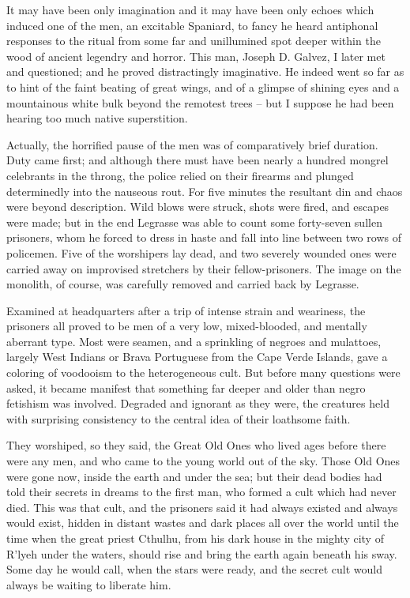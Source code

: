 It may have been only imagination and it may have been only echoes which induced one of the men, an excitable Spaniard, to fancy he heard antiphonal responses to the ritual from some far and unillumined spot deeper within the wood of ancient legendry and horror. This man, Joseph D. Galvez, I later met and questioned; and he proved distractingly imaginative. He indeed went so far as to hint of the faint beating of great wings, and of a glimpse of shining eyes and a mountainous white bulk beyond the remotest trees⁠ – but I suppose he had been hearing too much native superstition.

Actually, the horrified pause of the men was of comparatively brief duration. Duty came first; and although there must have been nearly a hundred mongrel celebrants in the throng, the police relied on their firearms and plunged determinedly into the nauseous rout. For five minutes the resultant din and chaos were beyond description. Wild blows were struck, shots were fired, and escapes were made; but in the end Legrasse was able to count some forty-seven sullen prisoners, whom he forced to dress in haste and fall into line between two rows of policemen. Five of the worshipers lay dead, and two severely wounded ones were carried away on improvised stretchers by their fellow-prisoners. The image on the monolith, of course, was carefully removed and carried back by Legrasse.

Examined at headquarters after a trip of intense strain and weariness, the prisoners all proved to be men of a very low, mixed-blooded, and mentally aberrant type. Most were seamen, and a sprinkling of negroes and mulattoes, largely West Indians or Brava Portuguese from the Cape Verde Islands, gave a coloring of voodooism to the heterogeneous cult. But before many questions were asked, it became manifest that something far deeper and older than negro fetishism was involved. Degraded and ignorant as they were, the creatures held with surprising consistency to the central idea of their loathsome faith.

They worshiped, so they said, the Great Old Ones who lived ages before there were any men, and who came to the young world out of the sky. Those Old Ones were gone now, inside the earth and under the sea; but their dead bodies had told their secrets in dreams to the first man, who formed a cult which had never died. This was that cult, and the prisoners said it had always existed and always would exist, hidden in distant wastes and dark places all over the world until the time when the great priest Cthulhu, from his dark house in the mighty city of R’lyeh under the waters, should rise and bring the earth again beneath his sway. Some day he would call, when the stars were ready, and the secret cult would always be waiting to liberate him.

